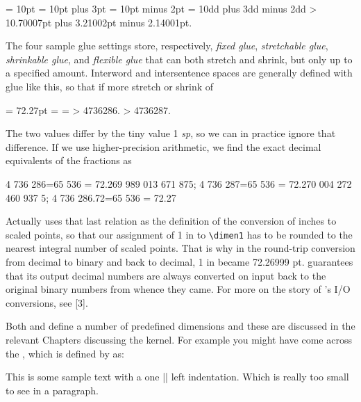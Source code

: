 \begin{teXXX}
   = 10pt
   = 10pt plus 3pt
   = 10pt minus 2pt
   = 10dd plus 3dd minus 2dd
  \showthe {}
  > 10.70007pt plus 3.21002pt minus 2.14001pt.
\end{teXXX}


The four sample glue settings store, respectively, \textit{fixed glue}, \textit{stretchable
glue}, \textit{shrinkable glue}, and \textit{flexible glue} that can both stretch and shrink,
but only up to a specified amount. Interword and intersentence spaces are
generally defined with glue like this, so that if more stretch or shrink of

\begin{teX}
 = 72.27pt
 = 
 = 
\showthe {}
> 4736286.
\showthe {}
> 4736287.
\end{teX}

The two values differ by the tiny value 1 \textit{sp}, so we can in practice ignore
that difference. If we use higher-precision arithmetic, we find the exact
decimal equivalents of the fractions as

\begin{teX}
4 736 286=65 536 = 72.269 989 013 671 875;
4 736 287=65 536 = 72.270 004 272 460 937 5;
4 736 286.72=65 536 = 72.27
\end{teX}


Actually \tex uses that last relation as the definition of the conversion of
inches to scaled points, so that our assignment of 1 in to \verb+\dimen1+ has to
be rounded to the nearest integral number of scaled points. That is why
in the round-trip conversion from decimal to binary and back to decimal,
1 in became 72.26999 pt. \tex guarantees that its output decimal numbers
are always converted on input back to the original binary numbers from
whence they came. For more on the story of \tex’s I/O conversions, see [3].


Both \tex and \latex define a number of predefined dimensions and these are discussed in the relevant Chapters discussing the \latex kernel. For example you might have come across the , which is defined by \latex as:

\begin{teXX}
\newdimen\jot
This is some sample text with a one |\jot| left indentation. Which is really too small to see in a paragraph.
\jot=3pt
\end{teXX}

